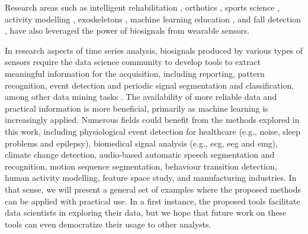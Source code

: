 Research areas such as intelligent rehabilitation \cite{liu19realtime, patel2012review, bonato2005advances, sung2005wearable, chen2015wearable, jakob2018robotic}, orthotics \cite{zhou22orthoses, menz2021objective, zhou21ankle, mangukiya2017electromyography}, sports science \cite{li20gait, liu22activityduration, mendes2016sensor, ji2018real, howard2016survey, mcnab2011iphone, howard2016wireless, yuji2005mems, espinosa2015inertial, ohgi2002microcomputer}, activity modelling \cite{liu2021thesis, chen2012sensor, chen2013ontology, liu2021motionunits}, exoskeletons \cite{wege2007electromyography, ganesan2015development}, machine learning education \cite{hartmann2022interactive}, and fall detection \cite{chen2006wearable, nyan2008wearable, xue2021hmm}, have also leveraged the power of biosignals from wearable sensors.

In research aspects of time series analysis, biosignals produced by various types of sensors require the data science community to develop tools to extract meaningful information for the acquisition, including reporting, pattern recognition, event detection and periodic signal segmentation and classification, among other data mining tasks \cite{rodrigues2017noise, david_thesis}. The availability of more reliable data and practical information is more beneficial, primarily as machine learning is increasingly applied. Numerous fields could benefit from the methods explored in this work, including physiological event detection for healthcare (e.g., noise, sleep problems and epilepsy), biomedical signal analysis (e.g., \gls{ecg}, \gls{eeg} and \gls{emg}), climate change detection, audio-based automatic speech segmentation and recognition, motion sequence segmentation, behaviour transition detection, human activity modelling, feature space study, and manufacturing industries. In that sense, we will present a general set of examples where the proposed methods can be applied with practical use. In a first instance, the proposed tools facilitate data scientists in exploring their data, but we hope that future work on these tools can even democratize their usage to other analysts.